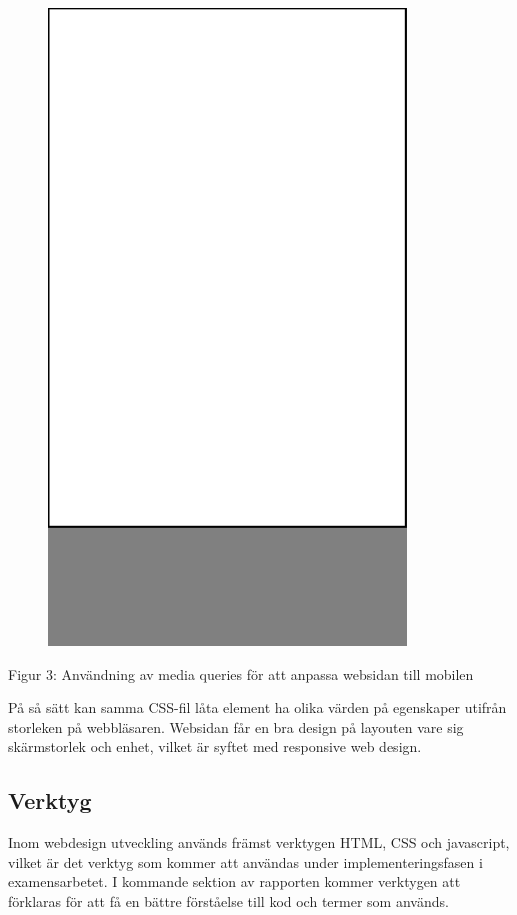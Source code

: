 \documentclass[11pt]{article}
\begin{document}
\vspace{0.5cm}
\begin{figure}[h]
\centerline{%
\includegraphics[scale=0.25]{pics/mobilesmall.png}
}
\end{figure}
\centerline{Figur 3: Användning av media queries för att anpassa websidan till mobilen}

På så sätt kan samma CSS-fil låta element ha olika värden på egenskaper utifrån storleken på webbläsaren. Websidan får en bra design på layouten vare sig skärmstorlek och enhet, vilket är syftet med 
responsive web design.

\subsection{Verktyg}

Inom webdesign utveckling används främst verktygen HTML, CSS och javascript, vilket är det verktyg som kommer att användas under implementeringsfasen i examensarbetet.  I kommande sektion av rapporten kommer verktygen att förklaras för att få en bättre förståelse till kod och termer som används.
\end{document}
